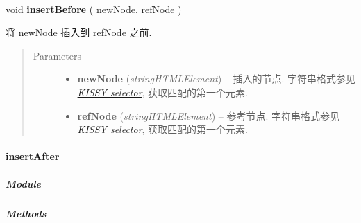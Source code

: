 \documentclass[letterpaper,10pt,english]{sphinxmanual}
\begin{document}
\begin{fulllineitems}
\label{api/core/dom/insertBefore:DOM.insertBefore}~
\begin{DUlineblock}{0em}
\item[] void \textbf{insertBefore} ( newNode, refNode )
\item[] 将 newNode 插入到 refNode 之前.
\end{DUlineblock}
\begin{quote}\begin{description}
\item[{Parameters}] \leavevmode\begin{itemize}
\item {}
\textbf{newNode} (\emph{string\textbar{}HTMLElement}) -- 插入的节点. 字符串格式参见 {\hyperref[api/core/dom/selector:dom-selector]{\emph{KISSY selector}}}, 获取匹配的第一个元素.

\item {}
\textbf{refNode} (\emph{string\textbar{}HTMLElement}) -- 参考节点. 字符串格式参见 {\hyperref[api/core/dom/selector:dom-selector]{\emph{KISSY selector}}}, 获取匹配的第一个元素.

\end{itemize}

\end{description}\end{quote}

\end{fulllineitems}



\paragraph{insertAfter}
\label{api/core/dom/insertAfter:insertafter}\label{api/core/dom/insertAfter::doc}

\subparagraph{Module}
\label{api/core/dom/insertAfter:module}\begin{quote}

{\hyperref[api/core/dom/index:module-DOM]{}}
\end{quote}


\subparagraph{Methods}
\label{api/core/dom/insertAfter:methods}
\end{document}
